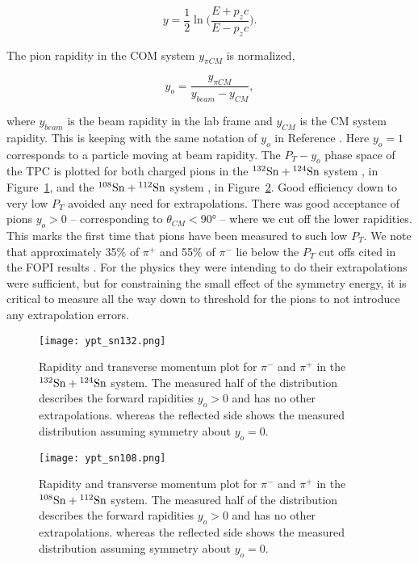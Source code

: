 \begin{equation}
y = \frac{1}{2} \ln\Big( \frac{E + p_zc}{E - p_zc}\Big).
\end{equation}

The pion rapidity in the COM system $y_{\pi CM}$ is normalized,

\begin{equation}
y_o = \frac{y_{\pi CM}}{y_{beam} - y_{CM}},
\end{equation}

where $y_{beam}$ is the beam rapidity in the lab frame and $y_{CM}$ is the CM system rapidity. This is keeping with the same notation of $y_o$ in Reference \cite{fopi}. Here $y_o = 1$ corresponds to a particle moving at beam rapidity. The   $P_T - y_o$ phase space of the \spirit TPC is plotted for both charged pions in the ${}^{132}\mathrm{Sn} + {}^{124}\mathrm{Sn}$ system , in Figure~\ref{fig:ptrap_sn132}, and the ${}^{108}\mathrm{Sn} + {}^{112}\mathrm{Sn}$ system , in Figure~\ref{fig:ptrap_sn108}. Good efficiency down to very low $P_T$ avoided any need for extrapolations. There was good acceptance of pions $y_o > 0$ -- corresponding to $\theta_{CM} < \ang{90}$ -- where we cut off the lower rapidities. This marks the first time that pions have been measured to such low $P_T$. We note that approximately 35\% of $\pi^+$ and 55\% of $\pi^-$ lie below the $P_T$ cut offs cited in the FOPI results \cite{fopi}. For the physics they were intending to do their extrapolations were sufficient, but for constraining the small effect of the symmetry energy, it is critical to measure all the way down to threshold for the pions to not introduce any extrapolation errors.

\begin{figure}[!htb]
\centering
\texttt{[image: ypt\_sn132.png]}
\caption{Rapidity and transverse momentum plot for $\pi^-$ and $\pi^+$ in the ${}^{132}\mathrm{Sn} + {}^{124}\mathrm{Sn}$ system. The measured half of the distribution describes the forward rapidities $y_o > 0$ and has no other extrapolations. whereas the reflected side shows the measured distribution assuming symmetry about $y_o = 0$.}
\label{fig:ptrap_sn132}
\end{figure}


\begin{figure}[!htb]
\centering
\texttt{[image: ypt\_sn108.png]}
\caption{Rapidity and transverse momentum plot for $\pi^-$ and $\pi^+$ in the ${}^{108}\mathrm{Sn} + {}^{112}\mathrm{Sn}$ system. The measured half of the distribution describes the forward rapidities $y_o > 0$ and has no other extrapolations. whereas the reflected side shows the measured distribution assuming symmetry about $y_o = 0$.}
\label{fig:ptrap_sn108}
\end{figure}

